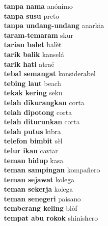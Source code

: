\textbf{ tanpa nama  } anónimo \\
\textbf{ tanpa susu  } preto \\
\textbf{ tanpa undang-undang  } anarkia \\
\textbf{ taram-temaram  } skur \\
\textbf{ tarian balet  } balèt \\
\textbf{ tarik balik  } kanselá \\
\textbf{ tarik hati  } atraé \\
\textbf{ tebal semangat  } konsiderabel \\
\textbf{ tebing laut  } beach \\
\textbf{ tekak kering  } seku \\
\textbf{ telah dikurangkan  } corta \\
\textbf{ telah dipotong  } corta \\
\textbf{ telah diturunkan  } corta \\
\textbf{ telah putus  } kibra \\
\textbf{ telefon bimbit  } sèl \\
\textbf{ telur ikan  } caviar \\
\textbf{ teman hidup  } kasa \\
\textbf{ teman sampingan  } kompañero \\
\textbf{ teman sejawat  } kolega \\
\textbf{ teman sekerja  } kolega \\
\textbf{ teman senegeri  } paisano \\
\textbf{ temberang keling  } blòf \\
\textbf{ tempat abu rokok  } shinishero \\
